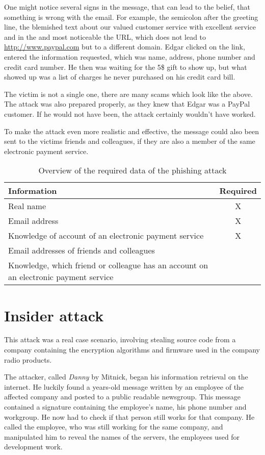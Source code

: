 One might notice several signs in the message, that can lead to the belief,
that something is wrong with the email. For example, the semicolon after the
greeting line, the blemished text about 
\glqq{}our valued customer service with excellent service and in the\grqq{} and
most noticeable the URL, which does not lead to \url{http://www.paypal.com} but
to a different domain. Edgar clicked on the link, entered the information
requested, which was name, address, phone number and credit card number. He
then was waiting for the 5\$ gift to show up, but what showed up was a list of
charges he never purchased on his credit card bill.

The victim is not a single one, there are many scams which look like the above.
The attack was also prepared properly, as they knew that Edgar was a PayPal
customer. If he would not have been, the attack certainly wouldn't have worked.

To make the attack even more realistic and effective, the message could also
been sent to the victims friends and colleagues, if they are also a member of
the same electronic payment service.

\begin{table*}[ht]
  \centering
  \begin{tabular}{p{}c}
    \toprule
    Information & Required\\
    \midrule
    Real name & X\\
    Email address & X\\
    Knowledge of account of an electronic payment service & X\\
    Email addresses of friends and colleagues & \\
    Knowledge, which friend or colleague has an account on an electronic
    payment service & \\
    \bottomrule
  \end{tabular}
  \caption{Overview of the required data of the phishing attack}
\end{table*}

\section{Insider attack}
\label{sec:insider_attack}

This attack was a real case scenario, involving stealing source code from a
company containing the encryption algorithms and firmware used in the company
radio products.

The attacker, called \textit{Danny} by Mitnick, began his information retrieval
on the internet. He luckily found a years-old message written by an employee of
the affected company and posted to a public readable newsgroup. This message
contained a signature containing the employee's name, his phone number and
workgroup. He now had to check if that person still works for that company. He
called the employee, who was still working for the same company, and
manipulated him to reveal the names of the servers, the employees used for
development work.

